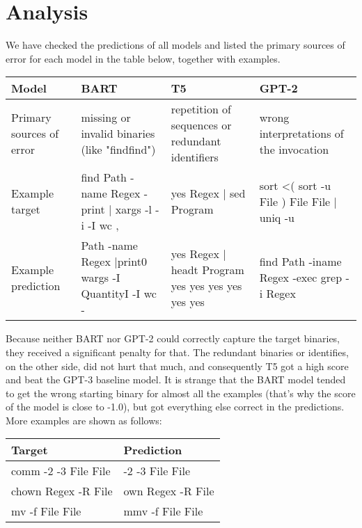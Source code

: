 \section{Analysis}
We have checked the predictions of all models and listed the primary sources of error for each model in the table below, together with examples.


\begin{center}
\begin{tabular}{ |M|L|L|L| } 
  \hline
  Model & BART & T5 & GPT-2 \\ 
  \hline
  Primary sources of error & 
  missing or invalid binaries (like "findfind") & 
  repetition of sequences or redundant identifiers & 
  wrong interpretations of the invocation\\ 
  \hline
  Example target & find Path -name Regex -print | xargs -l -i -I {} wc {} {}, & 
  yes Regex | sed Program &
  sort <( sort -u File ) File File | uniq -u \\ 
  \hline
  Example prediction & 
  Path -name Regex |print0 wargs -I QuantityI -I {} wc - & yes Regex | headt Program yes yes yes yes yes yes & 
  find Path -iname Regex -exec grep -i Regex {}\\
  \hline
\end{tabular}
\end{center}

Because neither BART nor GPT-2 could correctly capture the target binaries, they received a significant penalty for that. The redundant binaries or identifies, on the other side, did not hurt that much, and consequently T5 got a high score and beat the GPT-3 baseline model. It is strange that the BART model tended to get the wrong starting binary for almost all the examples (that's why the score of the model is close to -1.0), but got everything else correct in the predictions. More examples are shown as follows:
\begin{center}
\begin{tabular}{ |O|O| } 
  \hline
  Target & Prediction \\ 
  \hline
  comm -2 -3 File File & 
  -2 -3 File File\\ 
  \hline
  chown Regex -R File & 
  own Regex -R File \\ 
  \hline
  mv -f File File & mmv -f File File\\
  \hline
\end{tabular}
\end{center}

